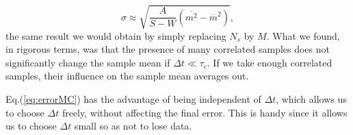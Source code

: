 \begin{equation}\label{eq:errorMC}
\sigma \approx \sqrt{ \frac{A}{S - W} ( \overline{m^2} - \overline{m}^2 )  }  ,
\end{equation}
the same result we would obtain by simply replacing $N_s$ by $M$.
What we found, in rigorous terms, was that the presence of many correlated samples does not significantly change the sample mean if $\Delta t \ll \tau_c$.
If we take enough correlated samples, their influence on the sample mean averages out.

Eq.(\ref{eq:errorMC}) has the advantage of being independent of $\Delta t$, which allows us to choose $\Delta t$ freely, without affecting the final error.
This is handy since it allows us to choose $\Delta t$ small so as not to lose data.
